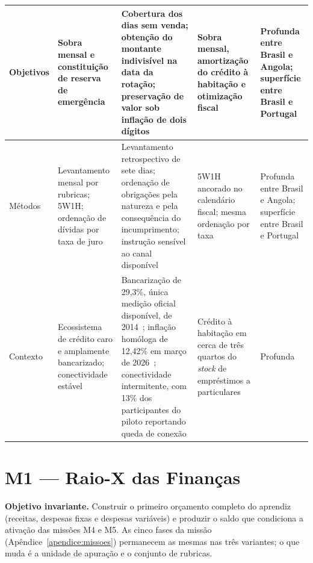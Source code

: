 {\begin{longtable}{>{\raggedright\arraybackslash}p{1.7cm}>{\raggedright\arraybackslash}p{2.9cm}>{\raggedright\arraybackslash}p{3.0cm}>{\raggedright\arraybackslash}p{2.9cm}>{\raggedright\arraybackslash}p{1.7cm}}
\hline
Objetivos & Sobra mensal e constituição de reserva de emergência & Cobertura dos dias sem venda; obtenção do montante indivisível na data da rotação; preservação de valor sob inflação de dois dígitos & Sobra mensal, amortização do crédito à habitação e otimização fiscal & Profunda entre Brasil e Angola; superfície entre Brasil e Portugal \\
\hline
Métodos & Levantamento mensal por rubricas; 5W1H; ordenação de dívidas por taxa de juro & Levantamento retrospectivo de sete dias; ordenação de obrigações pela natureza e pela consequência do incumprimento; instrução sensível ao canal disponível & 5W1H ancorado no calendário fiscal; mesma ordenação por taxa & Profunda entre Brasil e Angola; superfície entre Brasil e Portugal \\
\hline
Contexto & Ecossistema de crédito caro e amplamente bancarizado; conectividade estável & Bancarização de 29,3\%, única medição oficial disponível, de 2014~\cite{worldbank2022}; inflação homóloga de 12,42\% em março de 2026~\cite{ineangola2026ipcn}; conectividade intermitente, com 13\% dos participantes do piloto reportando queda de conexão & Crédito à habitação em cerca de três quartos do \textit{stock} de empréstimos a particulares~\cite{leitao2025} & Profunda \\
\hline
\end{longtable}}


\section*{M1 --- Raio-X das Finanças}

\noindent\textbf{Objetivo invariante.} Construir o primeiro orçamento completo do aprendiz (receitas, despesas fixas e despesas variáveis) e produzir o saldo que condiciona a ativação das missões M4 e M5. As cinco fases da missão (Apêndice~\ref{apendice:missoes}) permanecem as mesmas nas três variantes; o que muda é a unidade de apuração e o conjunto de rubricas.

